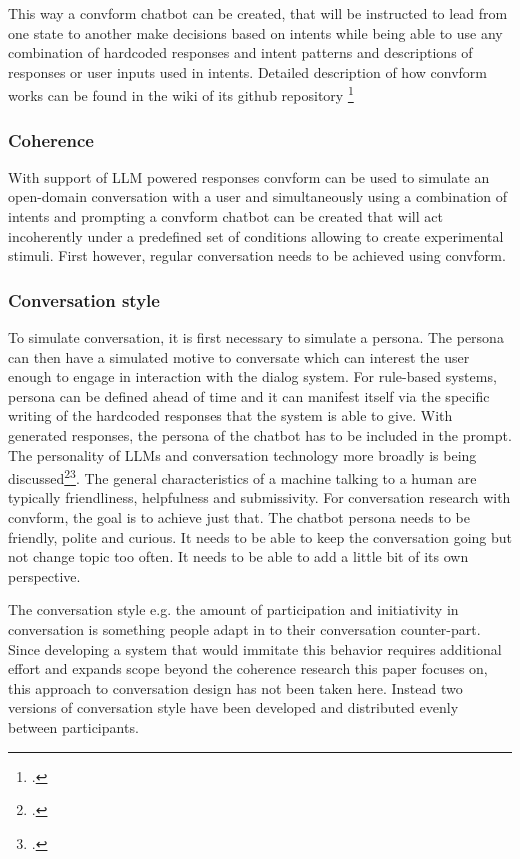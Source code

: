 \documentclass[12pt]{report}
\begin{document}
{\par
This way a convform chatbot can be created,
that will be instructed to lead from one state to another
make decisions based on intents
while being able to use any combination of
hardcoded responses and intent patterns
and descriptions of responses or user inputs used in intents.
Detailed description of how convform works can be found
in the wiki of its github repository \footcite{https://github.com/almarsk/convform/wiki}

\subsubsection{Coherence}
With support of LLM powered responses
convform can be used to simulate
an open-domain conversation with a user
and simultaneously using a combination
of intents and prompting
a convform chatbot can be created
that will act incoherently under a predefined set of conditions
allowing to create experimental stimuli.
First however, regular conversation needs to be achieved using convform.

\subsubsection{Conversation style}

To simulate conversation, it is first necessary to simulate a persona.
The persona can then have a simulated motive to conversate
which can interest the user enough to engage in interaction with the dialog system.
For rule-based systems, persona can be defined ahead of time
and it can manifest itself via the specific writing of the hardcoded responses
that the system is able to give.
With generated responses, the persona of the chatbot has to be included in the prompt.
The personality of LLMs and conversation technology more broadly
is being discussed\footcite{gpttoxicity}\footcite{robopersona}.
The general characteristics of a machine talking to a human are typically
friendliness, helpfulness and submissivity.
For conversation research with convform,
the goal is to achieve just that.
The chatbot persona needs to be friendly,
polite and curious.
It needs to be able to keep the conversation going
but not change topic too often.
It needs to be able to add a little bit of its own perspective.
\par
The conversation style e.g. the amount of participation and initiativity in conversation
is something people adapt in to their conversation counter-part.
Since developing a system that would immitate this behavior
requires additional effort
and expands scope beyond the coherence research
this paper focuses on,
this approach to conversation design
has not been taken here.
Instead two versions of conversation style
have been developed
and distributed evenly between participants.

}
\end{document}

